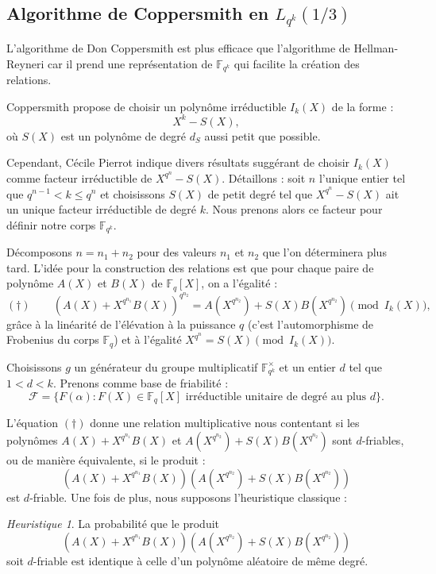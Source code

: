 \documentclass[a4paper, titlepage, 11pt]{article}
\theoremstyle{definition}
\theoremstyle{remark}
\newtheorem{heur}[theo]{Heuristique}
\def\gf #1{\mathbb{F}_{#1}}
\begin{document}
\subsection{Algorithme de Coppersmith en $L_{q^k}(1/3)$}

L'algorithme de Don Coppersmith \cite{coppersmith1984} est plus efficace que l'algorithme de Hellman-Reyneri car il prend une représentation de $\gf{q^k}$ qui facilite la création des relations.

Coppersmith propose de choisir un polynôme irréductible $I_k(X)$ de la forme : $$X^k - S(X),$$ où $S(X)$ est un polynôme de degré $d_S$ aussi petit que possible.

Cependant, Cécile Pierrot \cite{pierrot2016} indique divers résultats \cite{joux2006, joux2013} suggérant de choisir $I_k(X)$ comme facteur irréductible de $X^{q^n}-S(X)$. Détaillons : soit $n$ l'unique entier tel que $q^{n-1} < k \leqslant q^n$ et choisissons $S(X)$ de petit degré tel que $X^{q^n}-S(X)$ ait un unique facteur irréductible de degré $k$. Nous prenons alors ce facteur pour définir notre corps $\gf{q^k}$.

Décomposons $n = n_1 + n_2$ pour des valeurs $n_1$ et $n_2$ que l'on déterminera plus tard. L'idée pour la construction des relations est que pour chaque paire de polynôme $A(X)$ et $B(X)$ de $\gf{q}[X]$, on a l'égalité :
$$(\dagger) \qquad {\left( A(X) + X^{q^{n_1}}B(X)\right)}^{q^{n_2}} = A(X^{q^{n_2}}) + S(X)B(X^{q^{n_2}}) \pmod{I_k(X)},$$
grâce à la linéarité de l'élévation à la puissance $q$ (c'est l'automorphisme de Frobenius du corps $\gf{q}$) et à l'égalité $X^{q^n} = S(X) \pmod{I_k(X)}$.

Choisissons $g$ un générateur du groupe multiplicatif $\gf{q^k}^\times$ et un entier $d$ tel que $1 < d < k$. Prenons comme base de friabilité :
$$\mathcal{F} =  \{F(\alpha) : F(X) \in \gf{q}[X] \text{ irréductible unitaire de degré au plus } d \}.$$

L'équation $(\dagger)$ donne une relation multiplicative nous contentant si les polynômes $A(X) + X^{q^{n_1}}B(X)$ et $A(X^{q^{n_2}}) + S(X)B(X^{q^{n_2}})$ sont $d$-friables, ou de manière équivalente, si le produit :
$$\left( A(X) + X^{q^{n_1}}B(X)\right)\left( A(X^{q^{n_2}}) + S(X)B(X^{q^{n_2}})\right)$$
est $d$-friable. Une fois de plus, nous supposons l'heuristique classique :
\begin{heur}\label{heur:polydfriable}
La probabilité que le produit $$\left( A(X) + X^{q^{n_1}}B(X)\right)\left( A(X^{q^{n_2}}) + S(X)B(X^{q^{n_2}})\right)$$ soit $d$-friable est identique à celle d'un polynôme aléatoire de même degré.
\end{heur}
\end{document}
